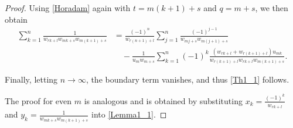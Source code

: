 \documentclass[12pt,reqno]{article}
\begin{document}
\begin{proof}
	Using \eqref{Horadam} again with $t=m(k+1)+s$ and $q=m+s$, we then obtain
		\begin{align*}
		\sum_{k=1}^n
		\frac{1}{w_{rk+l}w_{mk+s}w_{m(k+1)+s}}
		&=
		\frac{(-1)^n}{w_{r(n+1)+l}}
		\sum_{j=1}^n
		\frac{(-1)^{j-1}}{w_{mj+s}w_{m(j+1)+s}}
		\\
		&\quad
		-\frac{1}{u_m w_{m+s}}
		\sum_{k=1}^{n}
		(-1)^k
		\frac{(w_{rk+l}+w_{r(k+1)+l})u_{mk}}
		{w_{r(k+1)+l}w_{rk+l}w_{m(k+1)+s}}.
		\end{align*}
	
	Finally, letting $n\to\infty$, the boundary term vanishes, and thus \eqref{Th1_1} follows.
	
	The proof for even $m$ is analogous and is obtained by substituting
	$x_k=\frac{(-1)^k}{w_{rk+l}}$
	and $y_k=\frac{1}{w_{mk+s}w_{m(k+1)+s}}$ 	into \eqref{Lemma1_1}.
\end{proof}
\end{document}
